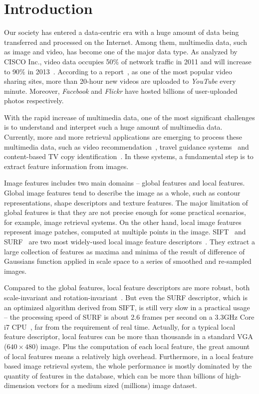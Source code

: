\section{Introduction}
\label{sec:introduction}

Our society has entered a data-centric era with a huge amount of data being transferred and processed on the Internet. Among them, multimedia data, such as image and video, has become one of the major data type. As analyzed by CISCO Inc., video data occupies 50\% of network traffic in 2011 and will increase to 90\% in 2013~\cite{index2010forecast}.  According to a report~\cite{jansohn2009detecting}, as one of the most popular video sharing sites, more than 20-hour new videos are uploaded to \emph{YouTube} every minute. Moreover, \emph{Facebook} and \emph{Flickr} have hosted billions of user-uploaded photos respectively.

With the rapid increase of multimedia data, one of the most significant challenges is to understand and interpret such a huge amount of multimedia data. Currently, more and more retrieval applications are emerging to process these multimedia data, such as video recommendation~\cite{videorecommendation2007}, travel guidance systems~\cite{travelguidance2010} and content-based TV copy identification~\cite{tvidentify2003}. In these systems, a fundamental step is to extract feature information from images. 

Image features includes two main domains -- global features and local features. Global image features tend to describe the image as a whole, such as contour representations, shape descriptors and texture features. The major limitation of global features is that they are not precise enough for some practical scenarios, for example, image retrieval systems. On the other hand, local image features represent image patches, computed at multiple points in the image. SIFT~\cite{Lowe2004SIFT,RobHess} and SURF~\cite{Bay2006SURF,Evans20009OpenSURF} are two most widely-used local image feature descriptors~\cite{Mikolajczyk2005Evaluation}\cite{Bauer2007Evaluation}. They extract a large collection of features as maxima and minima of the result of difference of Gaussians function applied in scale space to a series of smoothed and re-sampled images.

Compared to the global features, local feature descriptors are more robust, both scale-invariant and rotation-invariant~\cite{mikolajczyk2005performance}\cite{Bauer2007Evaluation}. But even the SURF descriptor, which is an optimized algorithm derived from SIFT, is still very slow in a practical usage -- the processing speed of SURF is about 2.6 frames per second on a 3.3GHz Core i7 CPU~\cite{Fang2011ispass}, far from the requirement of real time. Actually, for a typical local feature descriptor, local features can be more than thousands in a standard VGA ($640\times480$) image. Plus the computation of each local feature, the great amount of local features means a relatively high overhead. Furthermore, in a local feature based image retrieval system, the whole performance is mostly dominated by the quantity of features in the database, which can be more than billions of high-dimension vectors for a medium sized (millions) image dataset.

